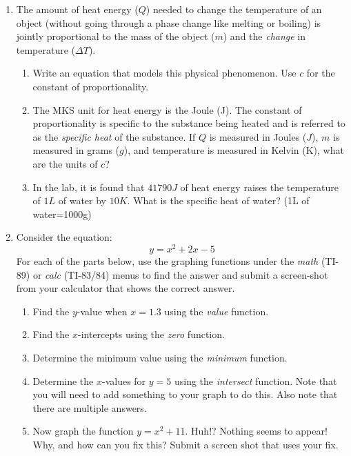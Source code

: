 \documentclass[letterpaper,12pt,fleqn]{article}
\begin{document}
\begin{enumerate}
\item The amount of heat energy ($Q$) needed to change the temperature of an
object (without going through a phase change like melting or boiling) is jointly
proportional to the mass of the object ($m$) and the \emph{change} in
temperature ($\Delta T$).
\begin{enumerate}
\item Write an equation that models this physical phenomenon. Use $c$ for the
constant of proportionality.
\item The MKS unit for heat energy is the Joule (J). The constant of
proportionality is specific to the substance being heated and is referred to as
the \emph{specific heat} of the substance. If $Q$ is measured in Joules ($J$),
$m$ is measured in grams ($g$), and temperature is measured in Kelvin (K), what
are the units of $c$?
\item In the lab, it is found that $41790J$ of heat energy raises the
temperature of $1L$ of water by $10K$. What is the specific heat of water?
(1L of water=1000g)
\end{enumerate}

\item Consider the equation:
\[y=x^2+2x-5\]
For each of the parts below, use the graphing functions under the \emph{math}
(TI-89) or \emph{calc} (TI-83/84) menus to find the answer and submit a
screen-shot from your calculator that shows the correct answer.
\begin{enumerate}
\item Find the $y$-value when $x=1.3$ using the \emph{value} function.
\item Find the $x$-intercepts using the \emph{zero} function.
\item Determine the minimum value using the \emph{minimum} function.
\item Determine the $x$-values for $y=5$ using the \emph{intersect} function.
Note that you will need to add something to your graph to do this. Also note
that there are multiple answers.
\item Now graph the function $y=x^2+11$. Huh!? Nothing seems to appear! Why,
and how can you fix this? Submit a screen shot that uses your fix.
\end{enumerate}

\end{enumerate}
\end{document}
